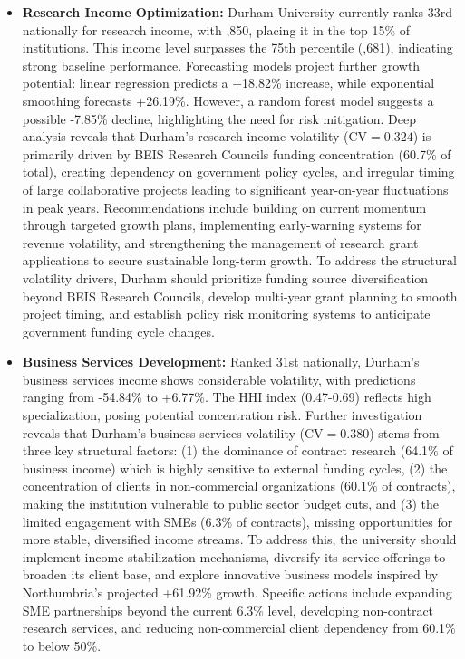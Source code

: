 \documentclass[journal,onecolumn, 10pt,draftclsnofoot]{IEEEtran}
\begin{document}
\begin{itemize}
    \item \textbf{Research Income Optimization:} Durham University currently ranks 33rd nationally for research income, with ,850, placing it in the top 15\% of institutions. This income level surpasses the 75th percentile (,681), indicating strong baseline performance. Forecasting models project further growth potential: linear regression predicts a +18.82\% increase, while exponential smoothing forecasts +26.19\%. However, a random forest model suggests a possible -7.85\% decline, highlighting the need for risk mitigation. Deep analysis reveals that Durham's research income volatility ($\mathrm{CV}=0.324$) is primarily driven by BEIS Research Councils funding concentration (60.7\% of total), creating dependency on government policy cycles, and irregular timing of large collaborative projects leading to significant year-on-year fluctuations in peak years. Recommendations include building on current momentum through targeted growth plans, implementing early-warning systems for revenue volatility, and strengthening the management of research grant applications to secure sustainable long-term growth. To address the structural volatility drivers, Durham should prioritize funding source diversification beyond BEIS Research Councils, develop multi-year grant planning to smooth project timing, and establish policy risk monitoring systems to anticipate government funding cycle changes.
      
    \item \textbf{Business Services Development:} Ranked 31st nationally, Durham's business services income shows considerable volatility, with predictions ranging from -54.84\% to +6.77\%. The HHI index (0.47-0.69) reflects high specialization, posing potential concentration risk. Further investigation reveals that Durham's business services volatility ($\mathrm{CV}=0.380$) stems from three key structural factors: (1) the dominance of contract research (64.1\% of business income) which is highly sensitive to external funding cycles, (2) the concentration of clients in non-commercial organizations (60.1\% of contracts), making the institution vulnerable to public sector budget cuts, and (3) the limited engagement with SMEs (6.3\% of contracts), missing opportunities for more stable, diversified income streams. To address this, the university should implement income stabilization mechanisms, diversify its service offerings to broaden its client base, and explore innovative business models inspired by Northumbria's projected +61.92\% growth. Specific actions include expanding SME partnerships beyond the current 6.3\% level, developing non-contract research services, and reducing non-commercial client dependency from 60.1\% to below 50\%.
    

\end{itemize}
\end{document}
